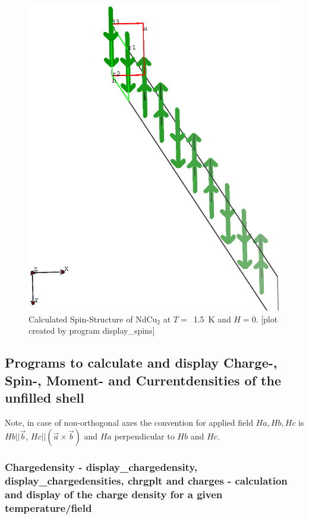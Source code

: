 \begin{figure}[hb]%
\begin{center}\leavevmode
\includegraphics[angle=0, width=1.0\textwidth]{figsrc/ndcu2b/resultss/spinsab.eps}
\end{center}
\caption{Calculated Spin-Structure of NdCu$_2$ at $T=$~1.5~K and $H=0$.
[plot created by program {\prg display\_spins}]}
\label{spingraphic}
\end{figure}

\subsection{Programs to calculate and display Charge-, Spin-, Moment- and Currentdensities
of the unfilled shell}
                          Note, in case of non-orthogonal axes the convention 
                           for applied field $Ha, Hb,Hc$ 
                            is $Hb||\vec b$, $Hc||(\vec a \times \vec b)$ and $Ha$ perpendicular to $Hb$ and $Hc$.

\subsubsection{Chargedensity - {\prg display\_chargedensity},
{\prg display\_chargedensities},
{\prg chrgplt} and  {\prg charges} - calculation and display of
the charge density for a given temperature/field}
\label{charges}

